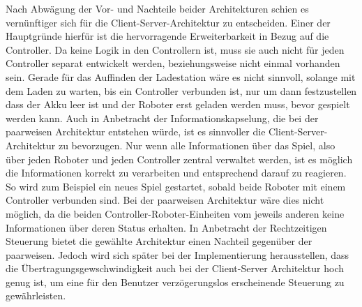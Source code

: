 Nach Abwägung der Vor- und Nachteile beider Architekturen schien es vernünftiger sich für die Client-Server-Architektur zu entscheiden. Einer der Hauptgründe hierfür ist die hervorragende Erweiterbarkeit in Bezug auf die Controller. Da keine Logik in den Controllern ist, muss sie auch nicht für jeden Controller separat entwickelt werden, beziehungsweise nicht einmal vorhanden sein. Gerade für das Auffinden der Ladestation wäre es nicht sinnvoll, solange mit dem Laden zu warten, bis ein Controller verbunden ist, nur um dann festzustellen dass der Akku leer ist und der Roboter erst geladen werden muss, bevor gespielt werden kann. Auch in Anbetracht der Informationskapselung, die bei der paarweisen Architektur entstehen würde, ist es sinnvoller die Client-Server-Architektur zu bevorzugen. Nur wenn alle Informationen über das Spiel, also über jeden Roboter und jeden Controller zentral verwaltet werden, ist es möglich die Informationen korrekt zu verarbeiten und entsprechend darauf zu reagieren. So wird zum Beispiel ein neues Spiel gestartet, sobald beide Roboter mit einem Controller verbunden sind. Bei der paarweisen Architektur wäre dies nicht möglich, da die beiden Controller-Roboter-Einheiten vom jeweils anderen keine Informationen über deren Status erhalten. In Anbetracht der Rechtzeitigen Steuerung bietet die gewählte Architektur einen Nachteil gegenüber der paarweisen. Jedoch wird sich später bei der Implementierung herausstellen, dass die Übertragungsgewschwindigkeit auch bei der Client-Server Architektur hoch genug ist, um eine für den Benutzer verzögerungslos erscheinende Steuerung zu gewährleisten.